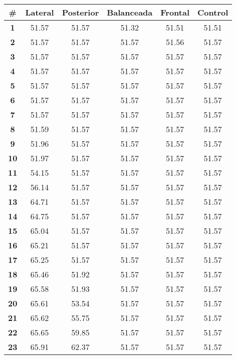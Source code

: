 \begin{longtable}{|c|c|c|c|c|c|}
    \hline
    \rowcolor[HTML]{ECF4FF} 
    \textbf{\#} & \textbf{Lateral} & \textbf{Posterior} & \textbf{Balanceada} & \textbf{Frontal} & \textbf{Control} \\ \hline
    \endhead
    \textbf{1} & 51.57 & 51.57 & 51.32 & 51.51 & 51.51 \\ \hline 
\textbf{2} & 51.57 & 51.57 & 51.57 & 51.56 & 51.57 \\ \hline 
\textbf{3} & 51.57 & 51.57 & 51.57 & 51.57 & 51.57 \\ \hline 
\textbf{4} & 51.57 & 51.57 & 51.57 & 51.57 & 51.57 \\ \hline 
\textbf{5} & 51.57 & 51.57 & 51.57 & 51.57 & 51.57 \\ \hline 
\textbf{6} & 51.57 & 51.57 & 51.57 & 51.57 & 51.57 \\ \hline 
\textbf{7} & 51.57 & 51.57 & 51.57 & 51.57 & 51.57 \\ \hline 
\textbf{8} & 51.59 & 51.57 & 51.57 & 51.57 & 51.57 \\ \hline 
\textbf{9} & 51.96 & 51.57 & 51.57 & 51.57 & 51.57 \\ \hline 
\textbf{10} & 51.97 & 51.57 & 51.57 & 51.57 & 51.57 \\ \hline 
\textbf{11} & 54.15 & 51.57 & 51.57 & 51.57 & 51.57 \\ \hline 
\textbf{12} & 56.14 & 51.57 & 51.57 & 51.57 & 51.57 \\ \hline 
\textbf{13} & 64.71 & 51.57 & 51.57 & 51.57 & 51.57 \\ \hline 
\textbf{14} & 64.75 & 51.57 & 51.57 & 51.57 & 51.57 \\ \hline 
\textbf{15} & 65.04 & 51.57 & 51.57 & 51.57 & 51.57 \\ \hline 
\textbf{16} & 65.21 & 51.57 & 51.57 & 51.57 & 51.57 \\ \hline 
\textbf{17} & 65.25 & 51.57 & 51.57 & 51.57 & 51.57 \\ \hline 
\textbf{18} & 65.46 & 51.92 & 51.57 & 51.57 & 51.57 \\ \hline 
\textbf{19} & 65.58 & 51.93 & 51.57 & 51.57 & 51.57 \\ \hline 
\textbf{20} & 65.61 & 53.54 & 51.57 & 51.57 & 51.57 \\ \hline 
\textbf{21} & 65.62 & 55.75 & 51.57 & 51.57 & 51.57 \\ \hline 
\textbf{22} & 65.65 & 59.85 & 51.57 & 51.57 & 51.57 \\ \hline 
\textbf{23} & 65.91 & 62.37 & 51.57 & 51.57 & 51.57 \\ \hline 

\end{longtable}
